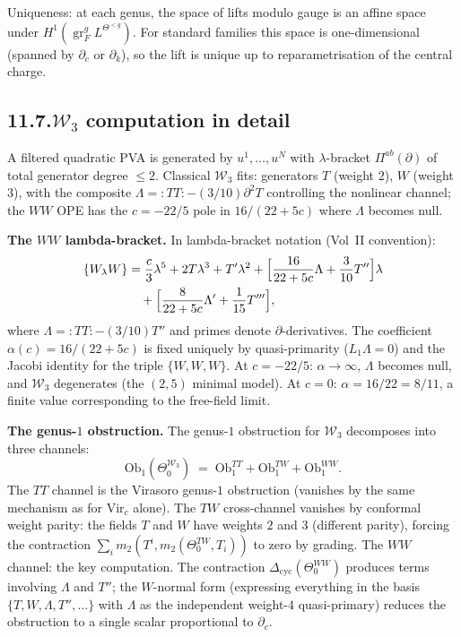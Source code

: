 \documentclass[11pt,reqno]{amsart}
\theoremstyle{definition}
\theoremstyle{remark}
\providecommand{\cW}{\mathcal{W}}
\providecommand{\Vir}{\mathrm{Vir}}
\providecommand{\Ob}{\mathrm{Ob}}
\DeclareMathOperator{\gr}{gr}
\numberwithin{equation}{section}
\begin{document}
Uniqueness: at each genus, the space of lifts modulo gauge
is an affine space under $H^1(\gr^g_F L^{\Theta^{<g}})$. For
standard families this space is one-dimensional (spanned by
$\partial_c$ or $\partial_k$), so the lift is unique up to
reparametrisation of the central charge.

\subsection*{11.7.\enspace $\cW_3$ computation in detail}

A filtered quadratic PVA is generated by $u^1, \ldots, u^N$ with
$\lambda$-bracket $\Pi^{ab}(\partial)$ of total generator degree
$\le 2$. Classical $\cW_3$ fits: generators $T$ (weight $2$),
$W$ (weight $3$), with the composite
$\Lambda = :TT: - (3/10)\partial^2 T$ controlling the nonlinear
channel; the $WW$ OPE has the $c = -22/5$ pole in
$16/(22 + 5c)$ where $\Lambda$ becomes null.

\medskip\noindent\textbf{The $WW$ lambda-bracket.}\enspace
In lambda-bracket notation (Vol~II convention):
\begin{align*}
\{W_\lambda W\}
&= \frac{c}{3}\lambda^5
+ 2T\lambda^3
+ T'\lambda^2
+ \Bigl[\frac{16}{22+5c}\Lambda
+ \frac{3}{10}T''\Bigr]\lambda\\
&\quad + \Bigl[\frac{8}{22+5c}\Lambda'
+ \frac{1}{15}T'''\Bigr],
\end{align*}
where $\Lambda = :TT: - (3/10)T''$ and primes denote
$\partial$-derivatives. The coefficient
$\alpha(c) = 16/(22 + 5c)$ is fixed uniquely by
quasi-primarity ($L_1 \Lambda = 0$) and the Jacobi identity for
the triple $\{W, W, W\}$. At $c = -22/5$: $\alpha \to \infty$,
$\Lambda$ becomes null, and $\cW_3$ degenerates (the $(2,5)$
minimal model). At $c = 0$: $\alpha = 16/22 = 8/11$, a finite
value corresponding to the free-field limit.

\medskip\noindent\textbf{The genus-$1$ obstruction.}\enspace
The genus-$1$ obstruction for $\cW_3$ decomposes into three
channels:
\[
\Ob_1(\Theta_0^{\cW_3})
\;=\;
\Ob_1^{TT} + \Ob_1^{TW} + \Ob_1^{WW}.
\]
The $TT$ channel is the Virasoro genus-$1$ obstruction
(vanishes by the same mechanism as for $\Vir_c$ alone). The
$TW$ cross-channel vanishes by conformal weight parity: the
fields $T$ and $W$ have weights $2$ and $3$ (different parity),
forcing the contraction $\sum_i m_2(T^i, m_2(\Theta_0^{TW}, T_i))$
to zero by grading. The $WW$ channel: the key computation.
The contraction $\Delta_{\mathrm{cyc}}(\Theta_0^{WW})$ produces
terms involving $\Lambda$ and $T''$; the
$W$-normal form (expressing everything in the basis
$\{T, W, \Lambda, T'', \ldots\}$ with $\Lambda$ as the
independent weight-$4$ quasi-primary) reduces the obstruction to
a single scalar proportional to $\partial_c$.
\end{document}
